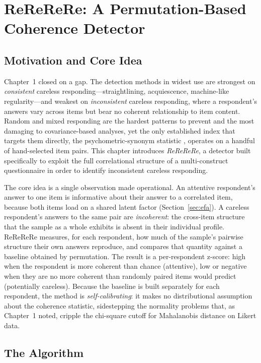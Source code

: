 \chapter[The ReReReRe Detector]{ReReReRe: A Permutation-Based Coherence Detector}
\label{ch:rerere}

\section{Motivation and Core Idea}

Chapter~1 closed on a gap. The detection methods in widest use are strongest on
\emph{consistent} careless responding---straightlining, acquiescence, machine-like
regularity---and weakest on \emph{inconsistent} careless responding, where a
respondent's answers vary across items but bear no coherent relationship to item
content. Random and mixed responding are the hardest patterns to prevent and the
most damaging to covariance-based analyses, yet the only established index that
targets them directly, the psychometric-synonym statistic
\parencite{meade2012identifying}, operates on a handful of hand-selected item
pairs. This chapter introduces \emph{ReReReRe}, a detector built specifically to
exploit the full correlational structure of a multi-construct questionnaire in
order to identify inconsistent careless responding.

The core idea is a single observation made operational. An attentive
respondent's answer to one item is informative about their answer to a
correlated item, because both items load on a shared latent factor
(Section~\ref{sec:efa}). A careless respondent's answers to the same pair are
\emph{incoherent}: the cross-item structure that the sample as a whole exhibits
is absent in their individual profile. ReReReRe measures, for each respondent,
how much of the sample's pairwise structure their own answers reproduce, and
compares that quantity against a baseline obtained by permutation. The result is
a per-respondent z-score: high when the respondent is more coherent than chance
(attentive), low or negative when they are no more coherent than randomly paired
items would predict (potentially careless). Because the baseline is built
separately for each respondent, the method is \emph{self-calibrating}: it makes
no distributional assumption about the coherence statistic, sidestepping the
normality problems that, as Chapter~1 noted, cripple the chi-square cutoff for
Mahalanobis distance on Likert data.

\section{The Algorithm}

